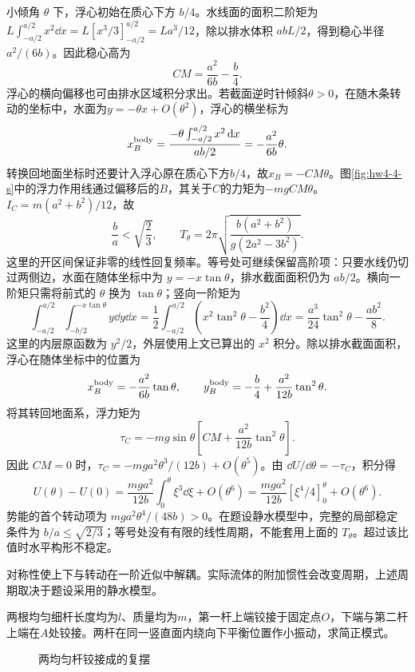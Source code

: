 \begin{solution}
小倾角 $\theta$ 下，浮心初始在质心下方 $b/4$。水线面的面积二阶矩为 $L\int_{-a/2}^{a/2}x^2\dd x=L[x^3/3]_{-a/2}^{a/2}=La^3/12$，除以排水体积 $abL/2$，得到稳心半径 $a^2/(6b)$。因此稳心高为
\[
 CM=\frac{a^2}{6b}-\frac b4.
\]
浮心的横向偏移也可由排水区域积分求出。若截面逆时针倾斜$\theta>0$，在随木条转动的坐标中，水面为$y=-\theta x+O(\theta^2)$，浮心的横坐标为
\[
 x_B^{\rm body}=\frac{-\theta\int_{-a/2}^{a/2}x^2\mathop{}\!\mathrm d x}{ab/2}
 =-\frac{a^2}{6b}\theta.
\]
转换回地面坐标时还要计入浮心原在质心下方$b/4$，故$x_B=-CM\theta$。图\ref{fig:hw4-4-s}中的浮力作用线通过偏移后的$B$，其关于$C$的力矩为$-mgCM\theta$。$I_C=m(a^2+b^2)/12$，故
\[
 \boxed{\frac ba<\sqrt{\frac23},\qquad
 T_\theta=2\pi\sqrt{\frac{b(a^2+b^2)}{g(2a^2-3b^2)}}}.
\]
这里的开区间保证非零的线性回复频率。等号处可继续保留高阶项：只要水线仍切过两侧边，水面在随体坐标中为 $y=-x\tan\theta$，排水截面面积仍为 $ab/2$。横向一阶矩只需将前式的 $\theta$ 换为 $\tan\theta$；竖向一阶矩为
\[
\int_{-a/2}^{a/2}\int_{-b/2}^{-x\tan\theta}y\dd y\dd x
=\frac12\int_{-a/2}^{a/2}\left(x^2\tan^2\theta-\frac{b^2}4\right)\dd x
=\frac{a^3}{24}\tan^2\theta-\frac{ab^2}8.
\]
这里的内层原函数为 $y^2/2$，外层使用上文已算出的 $x^2$ 积分。除以排水截面面积，浮心在随体坐标中的位置为
\[
 x_B^{\rm body}=-\frac{a^2}{6b}\tan\theta,\qquad
 y_B^{\rm body}=-\frac b4+\frac{a^2}{12b}\tan^2\theta.
\]
将其转回地面系，浮力矩为
\[
 \tau_C=-mg\sin\theta\left[CM+\frac{a^2}{12b}\tan^2\theta\right].
\]
因此 $CM=0$ 时，$\tau_C=-mga^2\theta^3/(12b)+O(\theta^5)$。由 $\dd U/\dd\theta=-\tau_C$，积分得
\[
U(\theta)-U(0)=\frac{mga^2}{12b}\int_0^\theta\xi^3\dd\xi+O(\theta^6)
=\frac{mga^2}{12b}[\xi^4/4]_0^\theta+O(\theta^6).
\]
势能的首个转动项为 $mga^2\theta^4/(48b)>0$。在题设静水模型中，完整的局部稳定条件为 $b/a\le\sqrt{2/3}$；等号处没有有限的线性周期，不能套用上面的 $T_\theta$。超过该比值时水平构形不稳定。

对称性使上下与转动在一阶近似中解耦。实际流体的附加惯性会改变周期，上述周期取决于题设采用的静水模型。


\end{solution}



\begin{example}[两均匀杆组成的复摆]\label{ex:hw4-6}

两根均匀细杆长度均为$l$、质量均为$m$，第一杆上端铰接于固定点$O$，下端与第二杆上端在$A$处铰接。两杆在同一竖直面内绕向下平衡位置作小振动，求简正模式。

\end{example}


\begin{figure}[H]\centering
{}
\caption{两均匀杆铰接成的复摆}\label{fig:hw4-6-q}
\end{figure}

